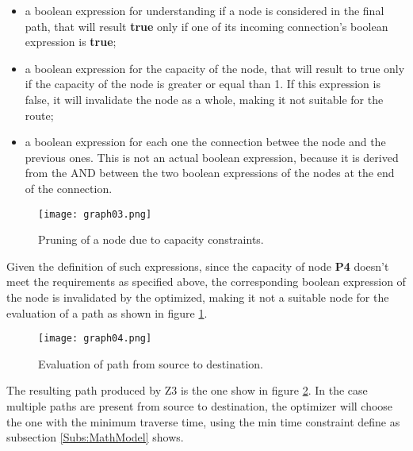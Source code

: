 \begin{itemize}
  \item a boolean expression for understanding if a node is considered in the final path, that will result \textbf{true} only if one of its incoming connection's boolean expression is \textbf{true};
  \item a boolean expression for the capacity of the node, that will result to true only if the capacity of the node is greater or equal than 1. If this expression is false, it will invalidate the node as a whole, making it not suitable for the route;
  \item a boolean expression for each one the connection betwee the node and the previous ones. This is not an actual boolean expression, because it is derived from the AND between the two boolean expressions of the nodes at the end of the connection.
\end{itemize}
\begin{figure}[!htb]
   \centering
   \texttt{[image: graph03.png]}
   \caption{Pruning of a node due to capacity constraints.}\label{Fig:Graph03}
\end{figure}
Given the definition of such expressions, since the capacity of node \textbf{P4} doesn't meet the requirements as specified above, the corresponding boolean expression of the node is invalidated by the optimized, making it not a suitable node for the evaluation of a path as shown in figure \ref{Fig:Graph03}.
\begin{figure}[!htb]
   \centering
   \texttt{[image: graph04.png]}
   \caption{Evaluation of path from source to destination.}\label{Fig:Graph04}
\end{figure}
The resulting path produced by Z3 is the one show in figure \ref{Fig:Graph04}. In the case multiple paths are present from source to destination, the optimizer will choose the one with the minimum traverse time, using the min time constraint define as subsection \ref{Subs:MathModel} shows.
